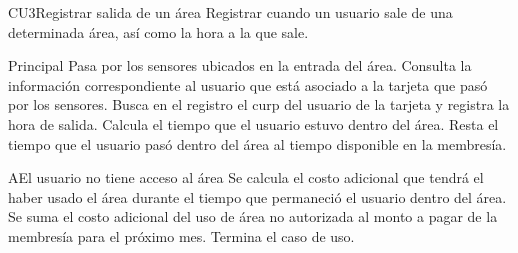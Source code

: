 
% 



	\begin{UseCase}{CU3}{Registrar salida de un área}{
		Registrar cuando un usuario sale de una determinada área, así como la hora a la que sale.
	}
	\end{UseCase}

	\begin{UCtrayectoria}{Principal}
		\UCpaso[\UCactor] Pasa por los sensores ubicados en la entrada del área.    
		\UCpaso Consulta la información correspondiente al usuario que está asociado a la tarjeta que pasó por los sensores.
		\UCpaso Busca en el registro el curp del usuario de la tarjeta y registra la hora de salida.
		\UCpaso Calcula el tiempo que el usuario estuvo dentro del área.
		\UCpaso Resta el tiempo que el usuario pasó dentro del área al tiempo disponible en la membresía. 
	\end{UCtrayectoria}

			
		
		\begin{UCtrayectoriaA}{A}{El usuario no tiene acceso al área}
			\UCpaso Se calcula el costo adicional que tendrá el haber usado el área durante el tiempo que permaneció el usuario dentro del área.
			\UCpaso Se suma el costo adicional del uso de área no autorizada al monto a pagar de la membresía para el próximo mes.
			\UCpaso[] Termina el caso de uso.
		\end{UCtrayectoriaA}
		
		\
		
